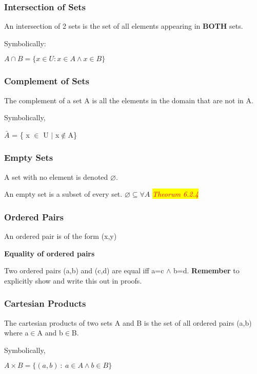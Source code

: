 \documentclass{article}
\newcommand{\theorum}[1]{\quad \quad \colorbox{yellow}{\textit{\textcolor{red}{Theorum #1}}}}
\newcommand{\sub}[1]{\vspace{10pt}\textbf{#1}}
\newcommand{\sbreak}{\vspace{10pt}}
\begin{document}
\subsubsection{Intersection of Sets}
An intersection of 2 sets is the set of all elements appearing in \textbf{BOTH} sets.

Symbolically:
\begin{center}
    $A\cap B = \{ x\in U: x\in A \wedge x \in B\}$
\end{center}

\subsubsection{Complement of Sets}
The complement of a set A is all the elements in the domain that are not in A.

Symbolically,
\begin{center}
    $\bar{A}$ = \{ x $\in$ U $\mid$ x$\notin$A\}
\end{center}

\subsubsection{Empty Sets}
A set with no element is denoted $\varnothing$.

An empty set is a subset of every set. $\varnothing \subseteq \forall A$ \theorum{6.2.4}

\subsubsection{Ordered Pairs}
An ordered pair is of the form (x,y)

\sub{Equality of ordered pairs}

Two ordered pairs (a,b) and (c,d) are equal iff \break a=c $\wedge$ b=d. \textbf{Remember} to explicitly show and write this out in proofs.

\subsubsection{Cartesian Products}
The cartesian products of two sets A and B is the set of all ordered pairs (a,b) where a$\in$A and b$\in$B.

Symbolically,
\begin{center}
    $A \times B = \{ (a,b)\ :\ a\in A \wedge b \in B\}$
\end{center}

\sbreak
\end{document}
